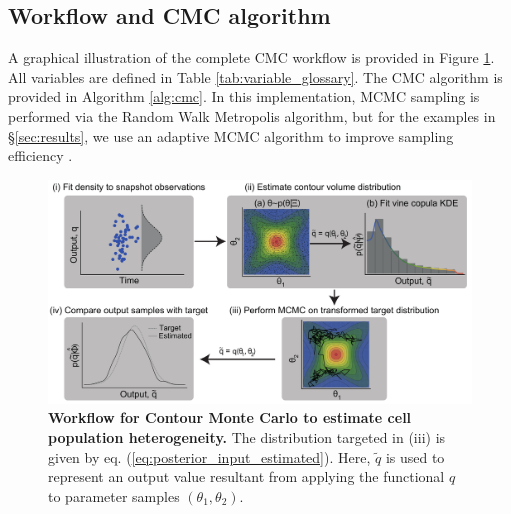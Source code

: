 \subsection{Workflow and CMC algorithm}

A graphical illustration of the complete CMC workflow is provided in Figure \ref{fig:workflow}. All variables are defined in Table \ref{tab:variable_glossary}. The CMC algorithm is provided in Algorithm \ref{alg:cmc}. In this implementation, MCMC sampling is performed via the Random Walk Metropolis algorithm, but for the examples in \S \ref{sec:results}, we use an adaptive MCMC algorithm to improve sampling efficiency \cite{johnstone2016uncertainty}.

\begin{figure}[H]
  \centerline{\includegraphics[width=1.0\textwidth]{../figures/workflow.pdf}}
  \caption{\textbf{Workflow for Contour Monte Carlo to estimate cell population heterogeneity.} The distribution targeted in (iii) is given by eq. (\ref{eq:posterior_input_estimated}). Here, $\tilde q$ is used to represent an output value resultant from applying the functional $q$ to parameter samples $(\theta_1,\theta_2)$.}
  \label{fig:workflow}
\end{figure}

